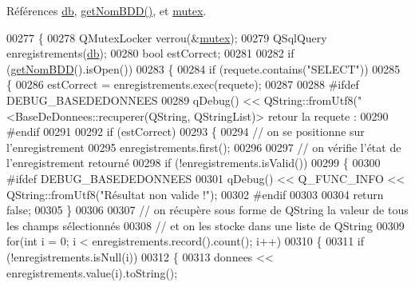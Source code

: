 Références \hyperlink{class_base_de_donnees_a3e738dcf443370c46a541677ab619f06}{db}, \hyperlink{class_base_de_donnees_a467909531ae3cdebaf173f6e97cdc624}{get\+Nom\+B\+D\+D()}, et \hyperlink{class_base_de_donnees_aa1b4696fac87a740f914aa73739086f2}{mutex}.


\begin{DoxyCode}
00277 \{
00278     QMutexLocker verrou(&\hyperlink{class_base_de_donnees_aa1b4696fac87a740f914aa73739086f2}{mutex});
00279     QSqlQuery enregistrements(\hyperlink{class_base_de_donnees_a3e738dcf443370c46a541677ab619f06}{db});
00280     \textcolor{keywordtype}{bool} estCorrect;
00281 
00282     \textcolor{keywordflow}{if} (\hyperlink{class_base_de_donnees_a467909531ae3cdebaf173f6e97cdc624}{getNomBDD}().isOpen())
00283     \{
00284         \textcolor{keywordflow}{if} (requete.contains(\textcolor{stringliteral}{"SELECT"}))
00285         \{
00286             estCorrect = enregistrements.exec(requete);
00287 
00288 \textcolor{preprocessor}{            #ifdef DEBUG\_BASEDEDONNEES}
00289             qDebug() << QString::fromUtf8(\textcolor{stringliteral}{"<BaseDeDonnees::recuperer(QString, QStringList)> retour %
       la requete : %
00290 \textcolor{preprocessor}{            #endif}
00291 
00292             \textcolor{keywordflow}{if} (estCorrect)
00293             \{
00294                 \textcolor{comment}{// on se positionne sur l'enregistrement}
00295                 enregistrements.first();
00296 
00297                 \textcolor{comment}{// on vérifie l'état de l'enregistrement retourné}
00298                 \textcolor{keywordflow}{if} (!enregistrements.isValid())
00299                 \{
00300 \textcolor{preprocessor}{                    #ifdef DEBUG\_BASEDEDONNEES}
00301                     qDebug() << Q\_FUNC\_INFO << QString::fromUtf8(\textcolor{stringliteral}{"Résultat non valide !"});
00302 \textcolor{preprocessor}{                    #endif}
00303 
00304                     \textcolor{keywordflow}{return} \textcolor{keyword}{false};
00305                 \}
00306 
00307                 \textcolor{comment}{// on récupère sous forme de QString la valeur de tous les champs sélectionnés}
00308                 \textcolor{comment}{// et on les stocke dans une liste de QString}
00309                 \textcolor{keywordflow}{for}(\textcolor{keywordtype}{int} i = 0; i < enregistrements.record().count(); i++)
00310                 \{
00311                     \textcolor{keywordflow}{if} (!enregistrements.isNull(i))
00312                     \{
00313                         donnees << enregistrements.value(i).toString();
}
\end{DoxyCode}
